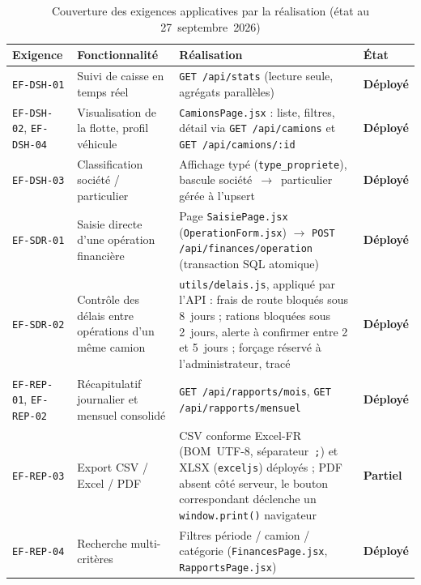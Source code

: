 \begin{table}[htbp]
\centering
\footnotesize
\caption{Couverture des exigences applicatives par la réalisation (état au 27~septembre~2026)}
\label{tab:couverture_webapp}
\begin{tabularx}{\linewidth}{|>{\raggedright\arraybackslash}p{2.0cm}|>{\raggedright\arraybackslash}p{3.1cm}|>{\raggedright\arraybackslash}X|>{\raggedright\arraybackslash}p{1.5cm}|}
\hline
\rowcolor[HTML]{EFEFEF}
\textbf{Exigence} & \textbf{Fonctionnalité} & \textbf{Réalisation} & \textbf{État} \\ \hline

\texttt{EF-DSH-01} & Suivi de caisse en temps réel & \texttt{GET /api/stats} (lecture seule, agrégats parallèles) & \textbf{Déployé} \\ \hline
\texttt{EF-DSH-02}, \texttt{EF-DSH-04} & Visualisation de la flotte, profil véhicule & \texttt{CamionsPage.jsx} : liste, filtres, détail via \texttt{GET /api/camions} et \texttt{GET /api/camions/:id} & \textbf{Déployé} \\ \hline
\texttt{EF-DSH-03} & Classification société / particulier & Affichage typé (\texttt{type\_propriete}), bascule société~$\rightarrow$~particulier gérée à l'upsert & \textbf{Déployé} \\ \hline
\texttt{EF-SDR-01} & Saisie directe d'une opération financière & Page \texttt{SaisiePage.jsx} (\texttt{OperationForm.jsx}) $\rightarrow$ \texttt{POST /api/finances/operation} (transaction SQL atomique) & \textbf{Déployé} \\ \hline
\texttt{EF-SDR-02} & Contrôle des délais entre opérations d'un même camion & \texttt{utils/delais.js}, appliqué par l'API : frais de route bloqués sous 8~jours ; rations bloquées sous 2~jours, alerte à confirmer entre 2 et 5~jours ; forçage réservé à l'administrateur, tracé & \textbf{Déployé} \\ \hline
\texttt{EF-REP-01}, \texttt{EF-REP-02} & Récapitulatif journalier et mensuel consolidé & \texttt{GET /api/rapports/mois}, \texttt{GET /api/rapports/mensuel} & \textbf{Déployé} \\ \hline
\texttt{EF-REP-03} & Export CSV / Excel / PDF & CSV conforme Excel-FR (BOM~UTF-8, séparateur~\texttt{;}) et XLSX (\texttt{exceljs}) déployés ; PDF absent côté serveur, le bouton correspondant déclenche un \texttt{window.print()} navigateur & \textbf{Partiel} \\ \hline
\texttt{EF-REP-04} & Recherche multi-critères & Filtres période / camion / catégorie (\texttt{FinancesPage.jsx}, \texttt{RapportsPage.jsx}) & \textbf{Déployé} \\ \hline

\end{tabularx}
\end{table}
